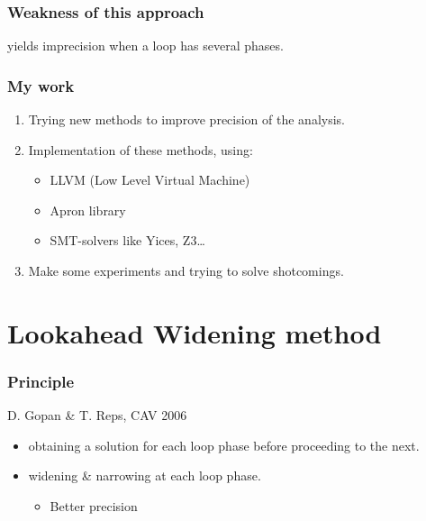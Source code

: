 \documentclass{beamer}
\begin{document}
\begin{frame}
\begin{columns}
\begin{column}{5cm}
\end{column}
\end{columns}
\end{frame}

\begin{frame}
  \frametitle{Weakness of this approach}
	\begin{center}
		yields imprecision when a loop has several phases.
	\end{center}
\end{frame}

\begin{frame}
  \frametitle{My work}
\begin{enumerate}
\item Trying new methods to improve precision of the analysis.
\item Implementation of these methods, using:
\begin{itemize}
\item LLVM (Low Level Virtual Machine)
\item Apron library
\item SMT-solvers like Yices, Z3\ldots
\end{itemize}
\item Make some experiments and trying to solve shotcomings.
\end{enumerate}
\end{frame}

\section[Lookahead Widening]{Lookahead Widening method}

\begin{frame}
  \frametitle{Principle}

D. Gopan \& T. Reps, CAV 2006
\bigskip
\begin{itemize}
\item obtaining a solution for each loop phase before proceeding to the next.
\item widening \& narrowing at each loop phase.
\begin{itemize}
\item Better precision
\end{itemize}
\end{itemize}
\end{frame}
\end{document}
